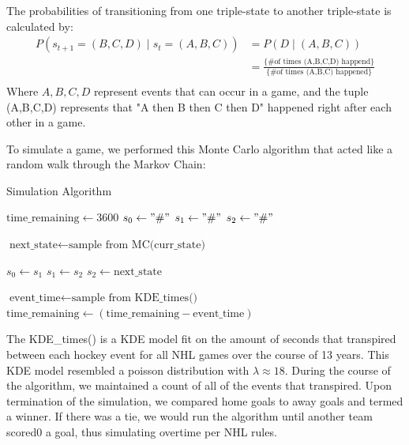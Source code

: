\documentclass[11pt]{article}
\begin{document}
The probabilities of transitioning from one triple-state to another triple-state is calculated by:
\begin{align*}
    P(s_{t+1} = (B,C,D) \;|\; s_t = (A,B,C)) &= P(D \;|\; (A,B,C)) \\
    &= \frac{\{ \text{\# of times (A,B,C,D) happend}\}}{\{ \text{\# of times (A,B,C) happened}\}} \\
\end{align*}
Where $A,B,C,D$ represent events that can occur in a game, and the tuple (A,B,C,D) represents that "A then 
B then C then D" happened right after each other in a game.

To simulate a game, we performed this Monte Carlo algorithm that acted like a random walk through the Markov Chain:
\begin{algorithm}[H]
    \caption{Simulation Algorithm}
    \begin{algorithmic}[1]
        \State $\text{time\_remaining} \gets 3600$
        \State $s_0 \gets "\#"$
        \State $s_1 \gets "\#"$
        \State $s_2 \gets "\#"$

            \State $\text{next\_state} \gets \text{sample from } \text{MC(curr\_state)}$
            
            \State $s_0 \gets s_1$
            \State $s_1 \gets s_2$
            \State $s_2 \gets \text{next\_state}$

            \State $\text{event\_time} \gets \text{sample from } \text{KDE\_times()}$
            \State $\text{time\_remaining} \gets (\text{time\_remaining} - \text{event\_time})$
        \EndWhile
    \end{algorithmic}
    \label{alg:monte_carlo_algorithm}
\end{algorithm}
The KDE\_times() is a KDE model fit on the amount of seconds that transpired between 
each hockey event for all NHL games over the course of 13 years. This KDE model 
resembled a poisson distribution with $\lambda \approx 18$. During the course of 
the algorithm, we maintained a count of all of the events that transpired. Upon 
termination of the simulation, we compared home goals to away goals and termed 
a winner. If there was a tie, we would run the algorithm until another team scored0 
a goal, thus simulating overtime per NHL rules.
\end{document}
